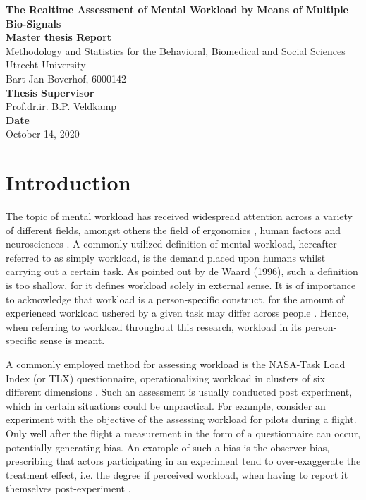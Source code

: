 \documentclass[12pt]{article}
\begin{document}
\begin{titlepage}
\begin{center}
\LARGE{\textbf{The Realtime Assessment of Mental Workload by Means of Multiple Bio-Signals}}\\
\vspace*{2\baselineskip}
\Large{\textbf{Master thesis Report}}\\
Methodology and Statistics for the Behavioral, Biomedical and Social Sciences\\
\vspace*{1\baselineskip}
Utrecht University\\
\vspace*{4\baselineskip}
{Bart-Jan Boverhof, 6000142}\\
\vspace*{1\baselineskip}
{\textbf{Thesis Supervisor}}\\
Prof.dr.ir. B.P. Veldkamp\\
\vspace*{1\baselineskip}
{\textbf{Date}}\\
October 14, 2020\\
\vspace*{1\baselineskip}
\end{center}
\end{titlepage}

\section{Introduction} \label{Introduction}
The topic of mental workload has received widespread attention across a variety of different fields, amongst others the field of ergonomics \cite{young2015state}, human factors \cite{pretorius2007development} and neurosciences \cite{shuggi2017mental}.
A commonly utilized definition of mental workload, hereafter referred to as simply workload, is the demand placed upon humans whilst carrying out a certain task. As pointed out by de Waard (1996), such a definition is too shallow, for it defines workload solely in external sense. It is of importance to acknowledge that workload is a person-specific construct, for the amount of experienced workload ushered by a given task may differ across people \cite{de1996measurement}. Hence, when referring to workload throughout this research, workload in its person-specific sense is meant.

A commonly employed method for assessing workload is the NASA-Task Load Index (or TLX) questionnaire, operationalizing workload in clusters of six different dimensions \cite{hart2006nasa}. Such an assessment is usually conducted post experiment, which in certain situations could be unpractical. For example, consider an experiment with the objective of the assessing workload for pilots during a flight. Only well after the flight a measurement in the form of a questionnaire can occur, potentially generating bias. An example of such a bias is the observer bias, prescribing that actors participating in an experiment tend to over-exaggerate the treatment effect, i.e. the degree if perceived workload, when having to report it themselves post-experiment \cite{mahtani2018catalogue}.
\end{document}
